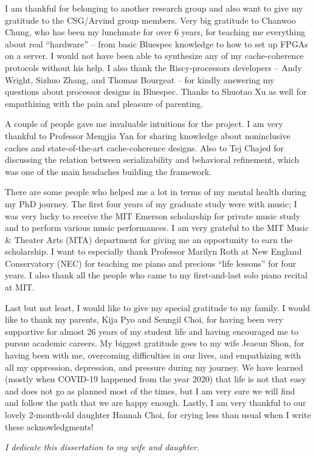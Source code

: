 \begin{singlespace}
I am thankful for belonging to another research group and also want to give my gratitude to the CSG/Arvind group members.
Very big gratitude to Chanwoo Chung, who has been my lunchmate for over 6 years, for teaching me everything about real ``hardware'' -- from basic Bluespec knowledge to how to set up FPGAs on a server.
I would not have been able to synthesize any of my \hemiola{} cache-coherence protocols without his help.
I also thank the Riscy-processors developers -- Andy Wright, Sizhuo Zhang, and Thomas Bourgeat -- for kindly answering my questions about processor designs in Bluespec.
Thanks to Shuotao Xu as well for empathizing with the pain and pleasure of parenting.

A couple of people gave me invaluable intuitions for the \hemiola{} project.
I am very thankful to Professor Mengjia Yan for sharing knowledge about noninclusive caches and state-of-the-art cache-coherence designs.
Also to Tej Chajed for discussing the relation between serializability and behavioral refinement, which was one of the main headaches building the framework.

There are some people who helped me a lot in terms of my mental health during my PhD journey.
The first four years of my graduate study were with music; I was very lucky to receive the MIT Emerson scholarship for private music study and to perform various music performances.
I am very grateful to the MIT Music \& Theater Arts (MTA) department for giving me an opportunity to earn the scholarship.
I want to especially thank Professor Marilyn Roth at New England Conservatory (NEC) for teaching me piano and precious ``life lessons'' for four years.
I also thank all the people who came to my first-and-last solo piano recital at MIT.

Last but not least, I would like to give my special gratitude to my family.
I would like to thank my parents, Kija Pyo and Seungil Choi, for having been very supportive for almost 26 years of my student life and having encouraged me to pursue academic careers.
My biggest gratitude goes to my wife Jeaeun Shon, for having been with me, overcoming difficulties in our lives, and empathizing with all my oppression, depression, and pressure during my journey.
We have learned (mostly when COVID-19 happened from the year 2020) that life is not that easy and does not go as planned most of the times, but I am very sure we will find and follow the path that we are happy enough.
Lastly, I am very thankful to our lovely 2-month-old daughter Hannah Choi, for crying less than usual when I write these acknowledgments!

\emph{I dedicate this dissertation to my wife and daughter.}
\end{singlespace}
